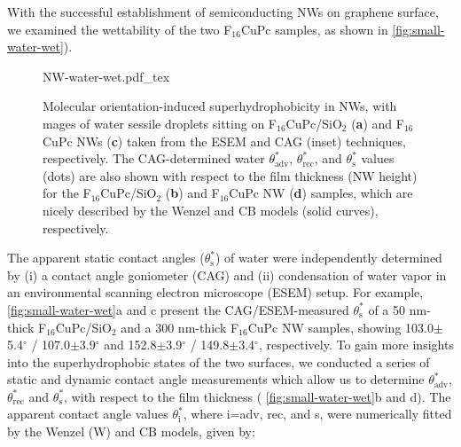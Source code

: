 With the successful establishment of semiconducting NWs on graphene
surface, we examined the wettability of the two F\(_{\text{16}}\)CuPc
samples, as shown in \autoref{fig:small-water-wet}).
%
\begin{figure}[htbp]
  \centering
  {NW-water-wet.pdf_tex}
  \caption{\label{fig:small-water-wet} Molecular
    orientation-induced superhydrophobicity in NWs, with mages of
    water sessile droplets sitting on
    F\(_{\text{16}}\)CuPc/SiO\(_{\text{2}}\) (\textbf{a}) and
    F\(_{\text{16}}\)CuPc NWs (\textbf{c}) taken from the ESEM and CAG
    (inset) techniques, respectively.
     The CAG-determined water
    \(\theta_{\mathrm{adv}}^{*}\), \(\theta_{\mathrm{rec}}^{*}\), and
    \(\theta_{\mathrm{s}}^{*}\) values (dots) are also shown with respect to the film
    thickness (NW height) for the
    F\(_{\text{16}}\)CuPc/SiO\(_{\text{2}}\) (\textbf{b}) and
    F\(_{\text{16}}\)CuPc NW (\textbf{d}) samples, which are nicely
    described by the Wenzel and CB models (solid curves),
    respectively.}
\end{figure}
%
The apparent
static contact angles (\(\theta_{\mathrm{s}}^{*}\)) of water were
independently determined by (i) a contact angle goniometer (CAG) and
(ii) condensation of water vapor in an environmental scanning electron
microscope (ESEM) setup. For example, \autoref{fig:small-water-wet}a and c
present the CAG/ESEM-measured \(\theta_{\mathrm{s}}^{*}\) of a 50
nm-thick F\(_{\text{16}}\)CuPc/SiO\(_{\text{2}}\) and a 300 nm-thick
F\(_{\text{16}}\)CuPc NW samples, showing 103.0\(\pm\)5.4\(^{\circ}\)
/ 107.0\(\pm\)3.9\(^{\circ}\) and 152.8\(\pm\)3.9\(^{\circ}\) /
149.8\(\pm\)3.4\(^{\circ}\), respectively. To gain more insights into
the superhydrophobic states of the two surfaces, we conducted a series
of static and dynamic contact angle measurements which allow us to
determine \(\theta_{\mathrm{adv}}^{*}\), \(\theta_{\mathrm{rec}}^{*}\)
and \(\theta_{\mathrm{s}}^{*}\), with respect to the film thickness (
\autoref{fig:small-water-wet}b and d). The apparent contact angle values
\(\theta_{\mathrm{i}}^{*}\), where i=adv, rec, and s, were numerically
fitted by the Wenzel (W) \autocite{Wenzel_1936_wetting} and CB
\autocite{Cassie_1944_wet} models, given by:

